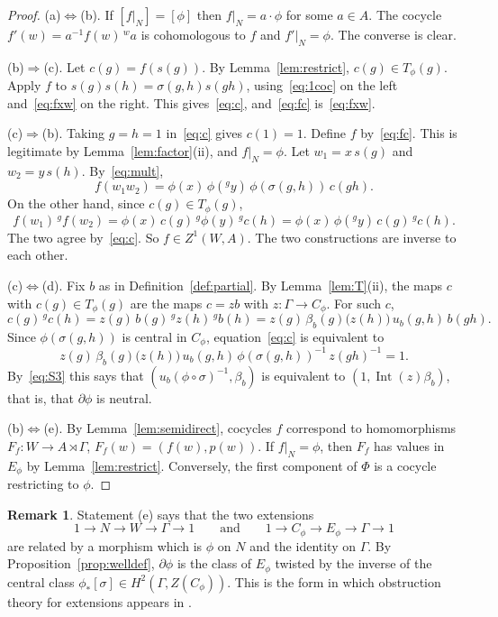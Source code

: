\documentclass[12pt,letterpaper]{article}
\numberwithin{equation}{section}
\theoremstyle{plain}
\theoremstyle{definition}
\newtheorem{remark}[theorem]{Remark}
\newcommand{\act}[2]{{}^{#1}\!#2}          %
\DeclareMathOperator{\Int}{Int}
\begin{document}
\begin{proof}
(a)$\Leftrightarrow$(b). If $[f|_N]=[\phi]$ then $f|_N=a\cdot\phi$ for some
$a\in A$. The cocycle $f'(w)=a^{-1}f(w)\,\act{w}{a}$ is cohomologous to $f$
and $f'|_N=\phi$. The converse is clear.

(b)$\Rightarrow$(c). Let $c(g)=f(s(g))$. By Lemma~\ref{lem:restrict},
$c(g)\in T_\phi(g)$. Apply $f$ to $s(g)s(h)=\sigma(g,h)s(gh)$,
using~\eqref{eq:1coc} on the left and~\eqref{eq:fxw} on the right. This
gives~\eqref{eq:c}, and~\eqref{eq:fc} is~\eqref{eq:fxw}.

(c)$\Rightarrow$(b). Taking $g=h=1$ in~\eqref{eq:c} gives $c(1)=1$. Define
$f$ by~\eqref{eq:fc}. This is legitimate by Lemma~\ref{lem:factor}(ii), and
$f|_N=\phi$. Let $w_1=x\,s(g)$ and $w_2=y\,s(h)$. By~\eqref{eq:mult},
\[
f(w_1w_2)=\phi(x)\,\phi(\act{g}{y})\,\phi(\sigma(g,h))\,c(gh).
\]
On the other hand, since $c(g)\in T_\phi(g)$,
\[
f(w_1)\,\act{g}{f(w_2)}=\phi(x)\,c(g)\,\act{g}{\phi(y)}\,\act{g}{c(h)}
=\phi(x)\,\phi(\act{g}{y})\,c(g)\,\act{g}{c(h)} .
\]
The two agree by~\eqref{eq:c}. So $f\in Z^1(W,A)$. The two constructions
are inverse to each other.

(c)$\Leftrightarrow$(d). Fix $b$ as in Definition~\ref{def:partial}. By
Lemma~\ref{lem:T}(ii), the maps $c$ with $c(g)\in T_\phi(g)$ are the maps
$c=zb$ with $z:\Gamma\to C_\phi$. For such $c$,
\[
c(g)\,\act{g}{c(h)}=z(g)\,b(g)\,\act{g}{z(h)}\,\act{g}{b(h)}
=z(g)\,\beta_b(g)\bigl(z(h)\bigr)\,u_b(g,h)\,b(gh).
\]
Since $\phi(\sigma(g,h))$ is central in $C_\phi$, equation~\eqref{eq:c} is
equivalent to
\[
z(g)\,\beta_b(g)\bigl(z(h)\bigr)\,u_b(g,h)\,\phi(\sigma(g,h))^{-1}\,
z(gh)^{-1}=1 .
\]
By~\eqref{eq:S3} this says that $(u_b(\phi\circ\sigma)^{-1},\beta_b)$ is
equivalent to $(1,\Int(z)\beta_b)$, that is, that $\partial\phi$ is
neutral.

(b)$\Leftrightarrow$(e). By Lemma~\ref{lem:semidirect}, cocycles $f$
correspond to homomorphisms $F_f:W\to A\rtimes\Gamma$, $F_f(w)=(f(w),p(w))$.
If $f|_N=\phi$, then $F_f$ has values in $E_\phi$ by
Lemma~\ref{lem:restrict}. Conversely, the first component of $\Phi$ is a
cocycle restricting to $\phi$.
\end{proof}

\begin{remark}\label{rem:baer}
Statement (e) says that the two extensions
\[
1\to N\to W\to\Gamma\to1\qquad\text{and}\qquad
1\to C_\phi\to E_\phi\to\Gamma\to1
\]
are related by a morphism which is $\phi$ on $N$ and the identity on
$\Gamma$. By Proposition~\ref{prop:welldef}, $\partial\phi$ is the class of
$E_\phi$ twisted by the inverse of the central class $\phi_*[\sigma]\in
H^2(\Gamma,Z(C_\phi))$. This is the form in which obstruction theory for
extensions appears in \cite[Ch.~IV, \S8]{ML63}.
\end{remark}
\end{document}
